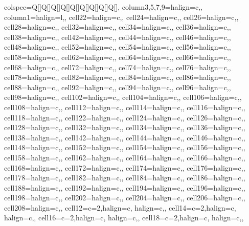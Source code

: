 \begin{table}
\centering
\begin{talltblr}[         %
entry=none,label=none,
note{}={+ p \num{< 0.1}, * p \num{< 0.05}, ** p \num{< 0.01}, *** p \num{< 0.001}},
]                     %
{                     %
colspec={Q[]Q[]Q[]Q[]Q[]Q[]Q[]Q[]Q[]},
column{3,5,7,9}={}{halign=c,},
column{1}={}{halign=l,},
cell{2}{2}={}{halign=c,},
cell{2}{4}={}{halign=c,},
cell{2}{6}={}{halign=c,},
cell{2}{8}={}{halign=c,},
cell{3}{2}={}{halign=c,},
cell{3}{4}={}{halign=c,},
cell{3}{6}={}{halign=c,},
cell{3}{8}={}{halign=c,},
cell{4}{2}={}{halign=c,},
cell{4}{4}={}{halign=c,},
cell{4}{6}={}{halign=c,},
cell{4}{8}={}{halign=c,},
cell{5}{2}={}{halign=c,},
cell{5}{4}={}{halign=c,},
cell{5}{6}={}{halign=c,},
cell{5}{8}={}{halign=c,},
cell{6}{2}={}{halign=c,},
cell{6}{4}={}{halign=c,},
cell{6}{6}={}{halign=c,},
cell{6}{8}={}{halign=c,},
cell{7}{2}={}{halign=c,},
cell{7}{4}={}{halign=c,},
cell{7}{6}={}{halign=c,},
cell{7}{8}={}{halign=c,},
cell{8}{2}={}{halign=c,},
cell{8}{4}={}{halign=c,},
cell{8}{6}={}{halign=c,},
cell{8}{8}={}{halign=c,},
cell{9}{2}={}{halign=c,},
cell{9}{4}={}{halign=c,},
cell{9}{6}={}{halign=c,},
cell{9}{8}={}{halign=c,},
cell{10}{2}={}{halign=c,},
cell{10}{4}={}{halign=c,},
cell{10}{6}={}{halign=c,},
cell{10}{8}={}{halign=c,},
cell{11}{2}={}{halign=c,},
cell{11}{4}={}{halign=c,},
cell{11}{6}={}{halign=c,},
cell{11}{8}={}{halign=c,},
cell{12}{2}={}{halign=c,},
cell{12}{4}={}{halign=c,},
cell{12}{6}={}{halign=c,},
cell{12}{8}={}{halign=c,},
cell{13}{2}={}{halign=c,},
cell{13}{4}={}{halign=c,},
cell{13}{6}={}{halign=c,},
cell{13}{8}={}{halign=c,},
cell{14}{2}={}{halign=c,},
cell{14}{4}={}{halign=c,},
cell{14}{6}={}{halign=c,},
cell{14}{8}={}{halign=c,},
cell{15}{2}={}{halign=c,},
cell{15}{4}={}{halign=c,},
cell{15}{6}={}{halign=c,},
cell{15}{8}={}{halign=c,},
cell{16}{2}={}{halign=c,},
cell{16}{4}={}{halign=c,},
cell{16}{6}={}{halign=c,},
cell{16}{8}={}{halign=c,},
cell{17}{2}={}{halign=c,},
cell{17}{4}={}{halign=c,},
cell{17}{6}={}{halign=c,},
cell{17}{8}={}{halign=c,},
cell{18}{2}={}{halign=c,},
cell{18}{4}={}{halign=c,},
cell{18}{6}={}{halign=c,},
cell{18}{8}={}{halign=c,},
cell{19}{2}={}{halign=c,},
cell{19}{4}={}{halign=c,},
cell{19}{6}={}{halign=c,},
cell{19}{8}={}{halign=c,},
cell{20}{2}={}{halign=c,},
cell{20}{4}={}{halign=c,},
cell{20}{6}={}{halign=c,},
cell{20}{8}={}{halign=c,},
cell{1}{2}={c=2,}{halign=c, halign=c,},
cell{1}{4}={c=2,}{halign=c, halign=c,},
cell{1}{6}={c=2,}{halign=c, halign=c,},
cell{1}{8}={c=2,}{halign=c, halign=c,},
}
\end{talltblr}
\end{table}
